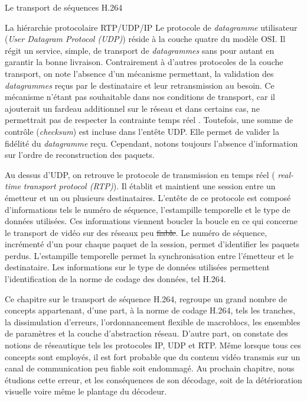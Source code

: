 \documentclass[letterpaper, twoside, 12pt,memoire]{thETS}
\newcommand{\ang}[1]{(\textit{#1})}
\providecommand{\DIFadd}[1]{{\protect\color{blue}\uwave{#1}}} %
\providecommand{\DIFdel}[1]{{\protect\color{red}\sout{#1}}}                      %
\providecommand{\DIFaddbegin}{} %
\providecommand{\DIFaddend}{} %
\providecommand{\DIFdelbegin}{} %
\providecommand{\DIFdelend}{} %
\begin{document}
\begin{chapter}{Le transport de séquences H.264}
\begin{section}{La hiérarchie protocolaire RTP/UDP/IP}
Le protocole de \textit{datagramme} utilisateur \ang{User Datagram Protocol
(UDP)} réside à la couche quatre du modèle OSI. Il régit un service, simple, de
transport de \textit{datagrammes} sans pour autant en garantir la bonne
livraison. Contrairement à d'autres protocoles de la couche transport, on note
l'absence d'un mécanisme permettant, la validation des \textit{datagrammes}
reçus par le destinataire et leur retransmission au besoin. Ce mécanisme n'étant
pas souhaitable dans nos conditions de transport, car il ajouterait un fardeau
additionnel sur le réseau et dans certains cas, ne permettrait pas de
respecter la contrainte temps réel \citep{Wenger2003}. Toutefois, une somme de
contrôle \ang{checksum} est incluse dans l'entête UDP. Elle permet de valider la
fidélité du \textit{datagramme} reçu. Cependant, notons toujours l'absence
d'information sur l'ordre de reconstruction des paquets.

Au dessus d'UDP, on retrouve le protocole de transmission en temps réel \ang{
real-time transport protocol (RTP)}. Il établit et maintient une session entre
un émetteur et un ou plusieurs destinataires. L'entête de ce protocole est
composé d'informations tels le numéro de séquence, l'estampille temporelle et le
type de données utilisées. Ces informations viennent boucler la boucle en ce qui
concerne le transport de vidéo sur des réseaux peu \DIFdelbegin \DIFdel{fiable}\DIFdelend \DIFaddbegin \DIFadd{fiables}\DIFaddend . Le numéro de
séquence, incrémenté d'un pour chaque paquet de la session, permet d'identifier
les paquets perdus. L'estampille temporelle permet la synchronisation entre
l'émetteur et le destinataire. Les informations sur le type de données utilisées
permettent l'identification de la norme de codage des données, tel H.264.
\end{section}

Ce chapitre sur le transport de séquence H.264, regroupe un grand nombre de
concepts appartenant, d'une part, à la norme de codage H.264, tels les tranches,
la dissimulation d'erreurs, l'ordonnancement flexible de macroblocs, les
ensembles de paramètres et la couche d'abstraction réseau. D'autre part, on
constate des notions de réseautique tels les protocoles IP, UDP et RTP. Même
lorsque tous ces concepts sont employés, il est fort probable que du contenu
vidéo transmis sur un canal de communication peu fiable soit endommagé. Au
prochain chapitre, nous étudions cette erreur, et les conséquences de son
décodage, soit de la détérioration visuelle voire même le plantage du décodeur.

\end{chapter}



\end{document}
